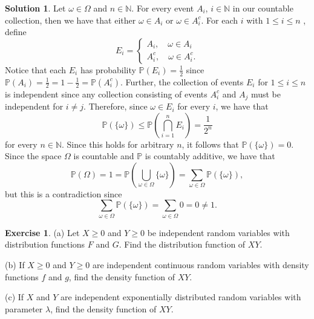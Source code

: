 \documentclass[12pt]{article}
\newcommand{\bbN}{\mathbb{N}}
\newcommand{\Prob}{\mathbb{P}}
\theoremstyle{definition}
\newtheorem{exer}{Exercise}
\newtheorem{sol}{Solution}
\theoremstyle{remark}
\begin{document}
\begin{sol}
    Let $\omega\in\Omega$ and $n\in\bbN$. For every event $A_i$, $i\in\bbN$ in our countable collection, then we have that either $\omega\in A_i$ or $\omega\in A_i^c$. For each $i$ with $1\leq i\leq n$ , define
    \begin{equation}
        E_i = 
        \begin{cases} 
            A_i, \quad \omega\in A_i\\
            A_i^c, \quad\omega\in A_i^c. 
        \end{cases}
    \end{equation}
    Notice that each $E_i$ has probability $\Prob(E_i) = \frac{1}{2}$ since $\Prob(A_i) = \frac{1}{2} = 1 - \frac{1}{2} = \Prob(A_i^c)$. Further, the collection of events $E_i$ for $1\leq i \leq n$ is independent since any collection consisting of events $A_i^c$ and $A_j$ must be independent for $i\neq j$. Therefore, since $\omega \in E_i$ for every $i$, we have that
    \begin{equation}
        \Prob(\{\omega\}) \leq \Prob \left( \bigcap_{i=1}^{n} E_i \right) = \frac{1}{2^n} 
    \end{equation}
    for every $n\in\bbN$. Since this holds for arbitrary $n$, it follows that $\Prob(\{\omega\}) = 0$. Since the space $\Omega$ is countable and $\Prob$ is countably additive, we have that 
    \begin{equation}
        \Prob(\Omega) =  1 = \Prob( \bigcup_{\omega\in\Omega} \{ \omega \}) = \sum_{\omega\in\Omega} \Prob(\{ \omega\}),
    \end{equation}
    but this is a contradiction since 
    \begin{equation}
        \sum_{\omega\in\Omega} \Prob(\{ \omega\}) = \sum_{\omega\in\Omega} 0 = 0 \neq 1.
    \end{equation}
\end{sol}

\newpage

\begin{exer}
    (a) Let $X\geq 0$ and $Y\geq 0$ be independent random variables with distribution functions $F$ and $G$. Find the distribution function of $XY$.

    (b) If $X\geq 0$ and $Y\geq 0$ are independent continuous random variables with density functions $f$ and $g$, find the density function of $XY$.

    (c) If $X$ and $Y$ are independent exponentially distributed random variables with parameter $\lambda$, find the density function of $XY$.
\end{exer}
\end{document}
